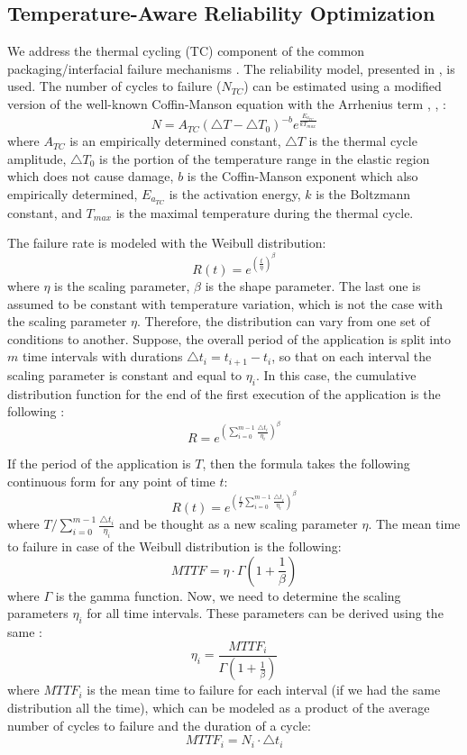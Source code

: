 \subsection{Temperature-Aware Reliability Optimization}
We address the thermal cycling (TC) component of the common packaging/interfacial failure mechanisms \cite{jedec2010}. The reliability model, presented in \cite{xiang2010}, is used. The number of cycles to failure ($N_{TC}$) can be estimated using a modified version of the well-known Coffin-Manson equation with the Arrhenius term \cite{jedec2010}, \cite{xiang2010}, \cite{ciappa2003}:
\begin{equation} \label{eq:cycles-to-failure}
  N = A_{TC} (\triangle T - \triangle T_0)^{-b} e^{\frac{E_{a_{TC}}}{k T_{max}}}
\end{equation}
where $A_{TC}$ is an empirically determined constant, $\triangle T$ is the thermal cycle amplitude, $\triangle T_0$ is the portion of the temperature range in the elastic region which does not cause damage, $b$ is the Coffin-Manson exponent which also empirically determined, $E_{a_{TC}}$ is the activation energy, $k$ is the Boltzmann constant, and $T_{max}$ is the maximal temperature during the thermal cycle.

The failure rate is modeled with the Weibull distribution:
\[
  R(t) = e^{(\frac{t}{\eta})^\beta}
\]
where $\eta$ is the scaling parameter, $\beta$ is the shape parameter. The last one is assumed to be constant with temperature variation, which is not the case with the scaling parameter $\eta$. Therefore, the distribution can vary from one set of conditions to another. Suppose, the overall period of the application is split into $m$ time intervals with durations $\triangle t_i = t_{i+1} - t_i$, so that on each interval the scaling parameter is constant and equal to $\eta_i$. In this case, the cumulative distribution function for the end of the first execution of the application is the following \cite{xiang2010}:
\[
  R = e^{(\sum_{i=0}^{m-1} \frac{\triangle t_i}{\eta_i})^\beta}
\]

If the period of the application is $T$, then the formula takes the following continuous form for any point of time $t$:
\[
  R(t) = e^{(\frac{t}{T} \sum_{i=0}^{m-1} \frac{\triangle t_i}{\eta_i})^\beta}
\]
where $T / \sum_{i=0}^{m-1} \frac{\triangle t_i}{\eta_i}$ and be thought as a new scaling parameter $\eta$. The mean time to failure in case of the Weibull distribution is the following:
\begin{equation} \label{eq:general-mttf}
  MTTF = \eta \cdot \Gamma(1 + \frac{1}{\beta})
\end{equation}
where $\Gamma$ is the gamma function. Now, we need to determine the scaling parameters $\eta_i$ for all time intervals. These parameters can be derived using the same :
\[
  \eta_i = \frac{MTTF_i}{\Gamma(1 + \frac{1}{\beta})}
\]
where $MTTF_i$ is the mean time to failure for each interval (if we had the same distribution all the time), which can be modeled as a product of the average number of cycles to failure  and the duration of a cycle:
\[
  MTTF_i = N_i \cdot \triangle t_i
\]

